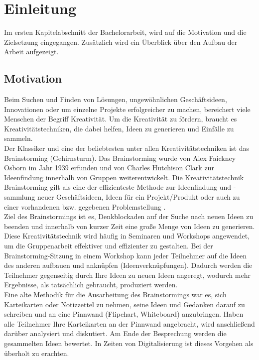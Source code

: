 \chapter{Einleitung}
\label{sec:einleitung}
Im ersten Kapitelabschnitt der Bachelorarbeit, wird auf die Motivation und die Zielsetzung eingegangen. Zusätzlich wird ein Überblick über den Aufbau der Arbeit aufgezeigt.

\section{Motivation}
\label{sec:motivation}
Beim Suchen und Finden von Lösungen, ungewöhnlichen Geschäftsideen, Innovationen oder um einzelne Projekte erfolgreicher zu machen, bereichert viele Menschen der Begriff Kreativität. Um die Kreativität zu fördern, braucht es Kreativitätstechniken, die dabei helfen, Ideen zu generieren und Einfälle zu sammeln.
\\

Der Klassiker und eine der beliebtesten unter allen Kreativitätstechniken ist das Brainstorming (Gehirnsturm). Das Brainstorming wurde von Alex Faickney Osborn im Jahr 1939 erfunden und von Charles Hutchison Clark zur Ideenfindung innerhalb von Gruppen weiterentwickelt. Die Kreativitätstechnik Brainstorming gilt als eine der effizienteste Methode zur Ideenfindung und -sammlung neuer Geschäftsideen, Ideen für ein Projekt/Produkt oder auch zu einer vorhandenen bzw. gegebenen Problemstellung \cite{Clark1972}. 
\\

Ziel des Brainstormings ist es, Denkblockaden auf der Suche nach neuen Ideen zu beenden und innerhalb von kurzer Zeit eine große Menge von Ideen zu generieren. Diese Kreativitätstechnik wird häufig in Seminaren und Workshops angewendet, um die Gruppenarbeit effektiver und effizienter zu gestalten. Bei der Brainstorming-Sitzung in einem Workshop kann jeder Teilnehmer auf die Ideen des anderen aufbauen und anknüpfen (Ideenverknüpfungen). Dadurch werden die Teilnehmer gegenseitig durch Ihre Ideen zu neuen Ideen angeregt, wodurch mehr Ergebnisse, als tatsächlich gebraucht, produziert werden. 
\\

Eine alte Methodik für die Ausarbeitung des Brainstormings war es, sich Karteikarten oder Notizzettel zu nehmen, seine Ideen und Gedanken darauf zu schreiben und an eine Pinnwand (Flipchart, Whiteboard) anzubringen. Haben alle Teilnehmer Ihre Karteikarten an der Pinnwand angebracht, wird anschließend darüber analysiert und diskutiert. Am Ende der Besprechung werden die gesammelten Ideen bewertet. In Zeiten von Digitalisierung ist dieses Vorgehen als überholt zu erachten.

